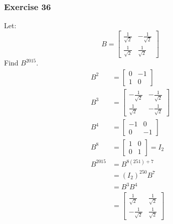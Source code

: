 \documentclass{math}
\begin{document}
\subsubsection*{Exercise 36}
Let:
\[ B = \begin{bmatrix}
  \frac{1}{\sqrt{2}} & -\frac{1}{\sqrt{2}} \\
  \frac{1}{\sqrt{2}} & \frac{1}{\sqrt{2}}
\end{bmatrix} \]
Find \( B^{2015} \).
\begin{align*}
  B^2 &= \begin{bmatrix}0 & -1 \\ 1 & 0\end{bmatrix} \\
  B^3 &= \begin{bmatrix}
    -\frac{1}{\sqrt{2}} & -\frac{1}{\sqrt{2}} \\
    \frac{1}{\sqrt{2}} & -\frac{1}{\sqrt{2}}
  \end{bmatrix} \\
  B^4 &= \begin{bmatrix}
    -1 & 0 \\
    0 & -1
  \end{bmatrix} \\
  B^8 &= \begin{bmatrix}
    1 & 0 \\
    0 & 1
  \end{bmatrix} = I_2 \\
  B^{2015} &= B^{8(251)+7} \\
  &= (I_2)^{250}B^7 \\
  &= B^3B^4 \\
  &= \begin{bmatrix}
    \frac{1}{\sqrt{2}} & \frac{1}{\sqrt{2}} \\
    -\frac{1}{\sqrt{2}} & \frac{1}{\sqrt{2}}
  \end{bmatrix}
\end{align*}
\end{document}
